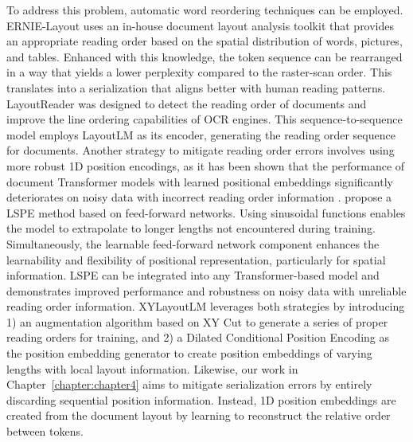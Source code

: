 To address this problem, automatic word reordering techniques can be employed. ERNIE-Layout \citep{peng2022ernie} uses an in-house document layout analysis toolkit that provides an appropriate reading order based on the spatial distribution of words, pictures, and tables. Enhanced with this knowledge, the token sequence can be rearranged in a way that yields a lower perplexity compared to the raster-scan order. This translates into a serialization that aligns better with human reading patterns. LayoutReader \citep{wang2021layoutreader} was designed to detect the reading order of documents and improve the line ordering capabilities of \ac{OCR} engines. This sequence-to-sequence model employs LayoutLM \citep{xu2020layoutlm} as its encoder, generating the reading order sequence for documents. Another strategy to mitigate reading order errors involves using more robust 1D position encodings, as it has been shown that the performance of document Transformer models with learned positional embeddings significantly deteriorates on noisy data with incorrect reading order information \citep{hong2020bros}. \citet{wang2022simple} propose a \ac{LSPE} method based on feed-forward networks. Using sinusoidal functions enables the model to extrapolate to longer lengths not encountered during training. Simultaneously, the learnable feed-forward network component enhances the learnability and flexibility of positional representation, particularly for spatial information. \ac{LSPE} can be integrated into any Transformer-based model and demonstrates improved performance and robustness on noisy data with unreliable reading order information. XYLayoutLM \citep{gu2022xylayoutlm} leverages both strategies by introducing 1) an augmentation algorithm based on XY Cut \citep{ha1995recursive} to generate a series of proper reading orders for training, and 2) a Dilated Conditional Position Encoding as the position embedding generator to create position embeddings of varying lengths with local layout information. Likewise, our work in Chapter~\ref{chapter:chapter4} aims to mitigate serialization errors by entirely discarding sequential position information. Instead, 1D position embeddings are created from the document layout by learning to reconstruct the relative order between tokens.


